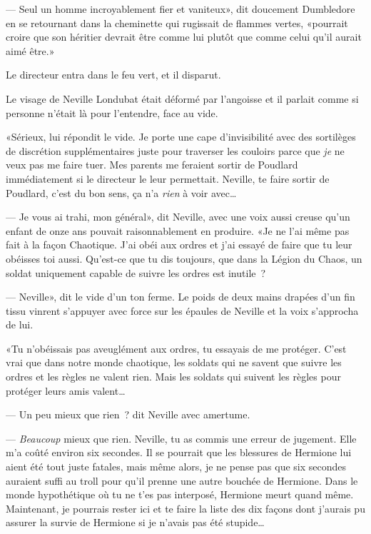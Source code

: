 --- Seul un homme incroyablement fier et vaniteux», dit doucement Dumbledore en se retournant dans la cheminette qui rugissait de flammes vertes, «pourrait croire que son héritier devrait être comme lui plutôt que comme celui qu'il aurait aimé être.»

Le directeur entra dans le feu vert, et il disparut.


Le visage de Neville Londubat était déformé par l'angoisse et il parlait comme si personne n'était là pour l'entendre, face au vide.

«Sérieux, lui répondit le vide. Je porte une cape d'invisibilité avec des sortilèges de discrétion supplémentaires juste pour traverser les couloirs parce que \emph{je} ne veux pas me faire tuer. Mes parents me feraient sortir de Poudlard immédiatement si le directeur le leur permettait. Neville, te faire sortir de Poudlard, c'est du bon sens, ça n'a \emph{rien} à voir avec…

--- Je vous ai trahi, mon général», dit Neville, avec une voix aussi creuse qu'un enfant de onze ans pouvait raisonnablement en produire. «Je ne l'ai même pas fait à la façon Chaotique. J'ai obéi aux ordres et j'ai essayé de faire que tu leur obéisses toi aussi. Qu'est-ce que tu dis toujours, que dans la Légion du Chaos, un soldat uniquement capable de suivre les ordres est inutile~?

--- Neville», dit le vide d'un ton ferme. Le poids de deux mains drapées d'un fin tissu vinrent s'appuyer avec force sur les épaules de Neville et la voix s'approcha de lui.

«Tu n'obéissais pas aveuglément aux ordres, tu essayais de me protéger. C'est vrai que dans notre monde chaotique, les soldats qui ne savent que suivre les ordres et les règles ne valent rien. Mais les soldats qui suivent les règles pour protéger leurs amis valent…

--- Un peu mieux que rien~? dit Neville avec amertume.

--- \emph{Beaucoup} mieux que rien. Neville, tu as commis une erreur de jugement. Elle m'a coûté environ six secondes. Il se pourrait que les blessures de Hermione lui aient été tout juste fatales, mais même alors, je ne pense pas que six secondes auraient suffi au troll pour qu'il prenne une autre bouchée de Hermione. Dans le monde hypothétique où tu ne t'es pas interposé, Hermione meurt quand même. Maintenant, je pourrais rester ici et te faire la liste des dix façons dont j'aurais pu assurer la survie de Hermione si je n'avais pas été stupide…

